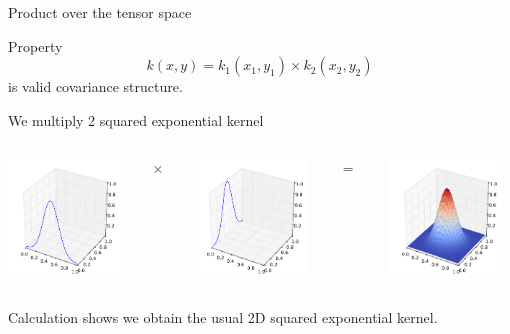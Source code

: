 \documentclass{beamer}
\begin{document}
\begin{frame}{Product over the tensor space}
\begin{block}{Property}
\begin{equation*}
k(x,y) = k_1(x_1,y_1) \times k_2(x_2,y_2)
\end{equation*}
is valid covariance structure.
\end{block}
\begin{example}
We multiply 2 squared exponential kernel
\begin{columns}[c]
\begin{column}{3cm}
\includegraphics[width=3cm]{figures/python/newfromold-sum2-k1}
\end{column}
\begin{column}{2mm}
$\times $
\end{column}
\begin{column}{3cm}
\includegraphics[width=3cm]{figures/python/newfromold-sum2-k2}
\end{column}
\begin{column}{2mm}
$=$
\end{column}
\begin{column}{3cm}
\includegraphics[width=3cm]{figures/python/newfromold-prod2-k12}
\end{column}
\end{columns}
\vspace{5mm}
Calculation shows we obtain the usual 2D squared exponential kernel.
\end{example}
\end{frame}
\end{document}
